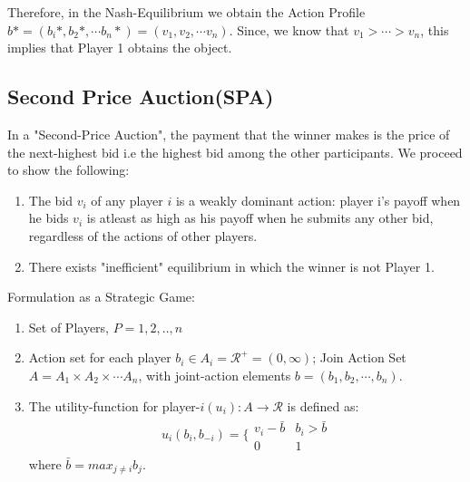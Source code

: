 \documentclass[11pt]{article}
\theoremstyle{definition}
\begin{document}
Therefore, in the Nash-Equilibrium we obtain the Action Profile $b* = (b_i*, b_2*, \cdots b_n*) = (v_1, v_2, \cdots v_n)$. Since, we know that $v_1 > \cdots > v_n$, this implies that Player 1 obtains the object.


\subsection{Second Price Auction(SPA)}
In a "Second-Price Auction", the payment that the winner makes is the price of the next-highest bid i.e the highest bid among the other participants. We proceed to show the following:
\begin{enumerate}
\item The bid $v_i$ of any player $i$ is a weakly dominant action: player i's payoff when he bids $v_i$ is atleast as high as his payoff when he submits any other bid, regardless of the actions of other players.
\item There exists "inefficient" equilibrium in which the winner is not Player 1.
\end{enumerate}

Formulation as a Strategic Game:
\begin{enumerate}
\item Set of Players, $P = {1,2, .., n}$
\item Action set for each player $b_i \in A_i = \mathcal{R}^{+}=(0,\infty)$; 
Join Action Set $A = A_1 \times A_2 \times \cdots A_n$, with joint-action elements $b = (b_1, b_2, \cdots, b_n)$.
\item The utility-function for player-$i (u_i): A \rightarrow \mathcal{R} $ is defined as:
\begin{align}
u_i(b_i,b_{-i}) = \bigg\{\begin{array}{cc}v_i - \bar{b} & b_i > \bar{b}\\ 0 & 1\end{array} \label{eq:SPA_utility}
\end{align}
where $\bar{b} = max_{j \neq i} b_j$.
\end{enumerate}
\end{document}
